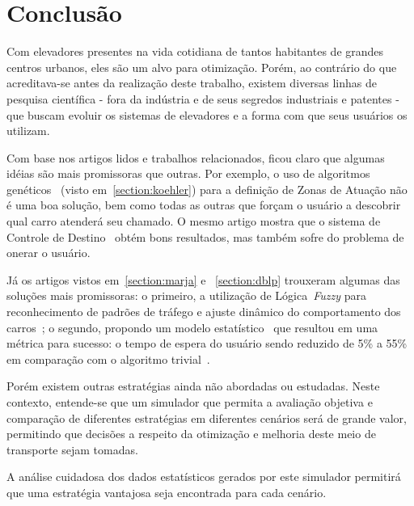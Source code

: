 \chapter{\label{chap:conclusion}Conclusão}

Com elevadores presentes na vida cotidiana de tantos habitantes de grandes
centros urbanos, eles são um alvo para otimização. Porém, ao contrário do que
acreditava-se antes da realização deste trabalho, existem diversas linhas de
pesquisa científica - fora da indústria e de seus segredos industriais e
patentes - que buscam evoluir os sistemas de elevadores e a forma com que seus
usuários os utilizam.

Com base nos artigos lidos e trabalhos relacionados, ficou claro que algumas
idéias são mais promissoras que outras. Por exemplo, o uso de algoritmos
genéticos~\cite{KOEHLEROTTIGER02} (visto em~\ref{section:koehler}) para a
definição de Zonas de Atuação não é uma boa solução, bem como todas as outras
que forçam o usuário a descobrir qual carro atenderá seu chamado. O mesmo artigo
mostra que o sistema de Controle de Destino~\cite{KOEHLEROTTIGER02} obtém bons
resultados, mas também sofre do problema de onerar o usuário.

Já os artigos vistos em~\ref{section:marja} e ~\ref{section:dblp} trouxeram
algumas das soluções mais promissoras: o primeiro, a utilização de
Lógica~\textit{Fuzzy} para reconhecimento de padrões de tráfego e ajuste
dinâmico do comportamento dos carros~\cite{marja97}; o segundo, propondo um
modelo estatístico~\cite{DBLP:journals/corr/abs-1212-2499} que resultou em uma
métrica para sucesso: o tempo de espera do usuário sendo reduzido de 5\% a 55\%
em comparação com o algoritmo trivial~\cite{DBLP:journals/corr/abs-1212-2499}.

Porém existem outras estratégias ainda não abordadas ou estudadas. Neste
contexto, entende-se que um simulador que permita a avaliação objetiva e
comparação de diferentes estratégias em diferentes cenários será de grande
valor, permitindo que decisões a respeito da otimização e melhoria deste meio de
transporte sejam tomadas.

A análise cuidadosa dos dados estatísticos gerados por este simulador permitirá
que uma estratégia vantajosa seja encontrada para cada cenário.